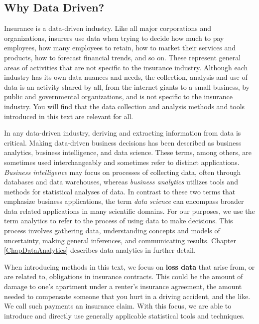 \documentclass[
]{book}
\begin{document}
\hypertarget{S:DataDriven}{%
\subsection{Why Data Driven?}\label{S:DataDriven}}

Insurance is a data-driven industry. Like all major corporations and organizations, insurers use data when trying to decide how much to pay employees, how many employees to retain, how to market their services and products, how to forecast financial trends, and so on. These represent general areas of activities that are not specific to the insurance industry. Although each industry has its own data nuances and needs, the collection, analysis and use of data is an activity shared by all, from the internet giants to a small business, by public and governmental organizations, and is not specific to the insurance industry. You will find that the data collection and analysis methods and tools introduced in this text are relevant for all.

In any data-driven industry, deriving and extracting information from data is critical. Making data-driven business decisions has been described as business analytics, business intelligence, and data science. These terms, among others, are sometimes used interchangeably and sometimes refer to distinct applications. \emph{Business intelligence} may focus on processes of collecting data, often through databases and data warehouses, whereas \emph{business analytics} utilizes tools and methods for statistical analyses of data. In contrast to these two terms that emphasize business applications, the term \emph{data science} can encompass broader data related applications in many scientific domains. For our purposes, we use the term analytics to refer to the process of using data to make decisions. This process involves gathering data, understanding concepts and models of uncertainty, making general inferences, and communicating results. Chapter \ref{ChapDataAnalytics} describes data analytics in further detail.

When introducing methods in this text, we focus on \textbf{loss data} that arise from, or are related to, obligations in insurance contracts. This could be the amount of damage to one's apartment under a renter's insurance agreement, the amount needed to compensate someone that you hurt in a driving accident, and the like. We call such payments an insurance claim. With this focus, we are able to introduce and directly use generally applicable statistical tools and techniques.
\end{document}

